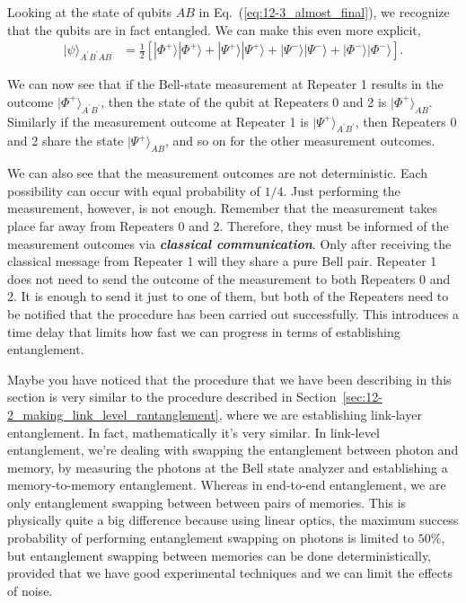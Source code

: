 Looking at the state of qubits $AB$ in Eq.~(\ref{eq:12-3_almost_final}), we recognize that the qubits are in fact entangled.
We can make this even more explicit,
\begin{align}
    |\psi\rangle_{A^{\prime}B^{\prime}AB} & = \frac{1}{2} \left[ |\Phi^+\rangle |\Phi^+\rangle + |\Psi^+\rangle |\Psi^+\rangle + |\Psi^-\rangle |\Psi^-\rangle + |\Phi^-\rangle |\Phi^-\rangle \right].
    \label{eq:12-3_final}
\end{align}

We can now see that if the Bell-state measurement at Repeater 1 results in the outcome $|\Phi^+\rangle_{A^{\prime}B^{\prime}}$, then the state of the qubit at Repeaters 0 and 2 is $|\Phi^+\rangle_{AB}$.
Similarly if the measurement outcome at Repeater 1 is $|\Psi^+\rangle_{A^{\prime}B^{\prime}}$, then Repeaters 0 and 2 share the state $|\Psi^+\rangle_{AB}$, and so on for the other measurement outcomes.

We can also see that the measurement outcomes are not deterministic.
Each possibility can occur with equal probability of $1/4$.
Just performing the measurement, however, is not enough.
Remember that the measurement takes place far away from Repeaters 0 and 2.
Therefore, they must be informed of the measurement outcomes via \textit{\textbf{classical communication}}.
Only after receiving the classical message from Repeater 1 will they share a pure Bell pair.
Repeater 1 does not need to send the outcome of the measurement to both Repeaters 0 and 2.
It is enough to send it just to one of them, but both of the Repeaters need to be notified that the procedure has been carried out successfully.
This introduces a time delay that limits how fast we can progress in terms of establishing entanglement.

Maybe you have noticed that the procedure that we have been describing in this section is very similar to the procedure described in Section~\ref{sec:12-2_making_link_level_rantanglement}, where we are establishing link-layer entanglement.
In fact, mathematically it's very similar.
In link-level entanglement, we're dealing with swapping the entanglement between photon and memory, by measuring the photons at the Bell state analyzer and establishing a memory-to-memory entanglement.
Whereas in end-to-end entanglement, we are only entanglement swapping between between pairs of memories.
This is physically quite a big difference because using linear optics, the maximum success probability of performing entanglement swapping on photons is limited to $50\%$, but entanglement swapping between memories can be done deterministically, provided that we have good experimental techniques and we can limit the effects of noise.

